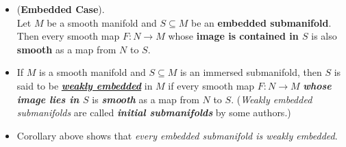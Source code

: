 \documentclass[11pt]{article}
\begin{document}
\begin{itemize}
\item \begin{corollary} (\textbf{Embedded Case}). \\
Let $M$ be a smooth manifold and $S \subseteq M$ be an \textbf{embedded submanifold}. Then every smooth map $F: N \rightarrow M$ whose \textbf{image is
contained in $S$} is also \textbf{smooth} as a map from $N$ to $S$.
\end{corollary}

\item \begin{definition}
If $M$ is a smooth manifold and $S \subseteq M$ is an immersed submanifold, then $S$ is said to be \underline{\emph{\textbf{weakly embedded}}} in $M$ if every smooth map $F: N \rightarrow M$ \emph{\textbf{whose image lies in $S$}} is \textbf{\emph{smooth}} as a map from $N$ to $S$. (\emph{Weakly embedded submanifolds} are called \emph{\textbf{initial submanifolds}} by some authors.) 
\end{definition}

\item \begin{remark}
Corollary above shows that \emph{every embedded submanifold is weakly embedded}.
\end{remark}
\end{itemize}
\end{document}
